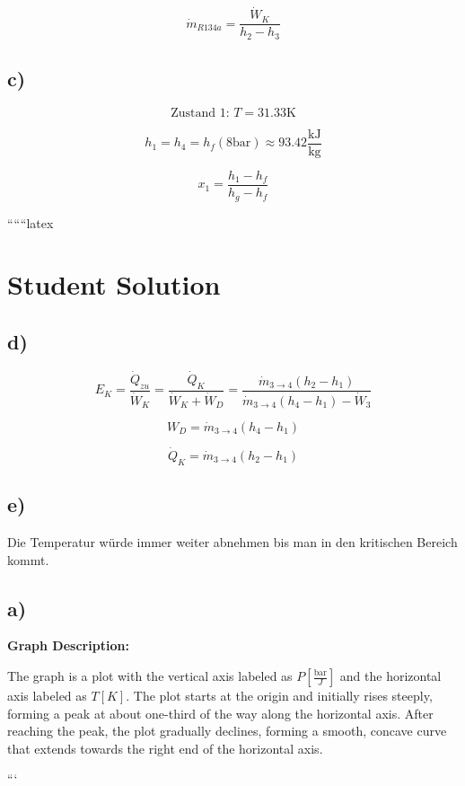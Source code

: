 \[
\dot{m}_{R134a} = \frac{\dot{W}_K}{h_2 - h_3}
\]

\subsection*{c)}

\[
\text{Zustand 1: } T = 31.33 \text{K}
\]

\[
h_1 = h_4 = h_f (8 \text{bar}) \approx 93.42 \frac{\text{kJ}}{\text{kg}}
\]

\[
x_1 = \frac{h_1 - h_f}{h_g - h_f}
\]

``````latex


\section*{Student Solution}

\subsection*{d)}
\begin{equation*}
    E_K = \frac{\dot{Q}_{zu}}{\dot{W}_K} = \frac{\dot{Q}_K}{\dot{W}_K + \dot{W}_D} = \frac{\dot{m}_{3\to4}(h_2 - h_1)}{\dot{m}_{3\to4}(h_4 - h_1) - \dot{W}_3}
\end{equation*}

\begin{equation*}
    W_D = \dot{m}_{3\to4}(h_4 - h_1)
\end{equation*}

\begin{equation*}
    \dot{Q}_K = \dot{m}_{3\to4}(h_2 - h_1)
\end{equation*}

\subsection*{e)}
Die Temperatur würde immer weiter abnehmen bis man in den kritischen Bereich kommt.

\subsection*{a)}
\textbf{Graph Description:} 

The graph is a plot with the vertical axis labeled as \( P \left[ \frac{\text{bar}}{J} \right] \) and the horizontal axis labeled as \( T \left[ K \right] \). The plot starts at the origin and initially rises steeply, forming a peak at about one-third of the way along the horizontal axis. After reaching the peak, the plot gradually declines, forming a smooth, concave curve that extends towards the right end of the horizontal axis.

```